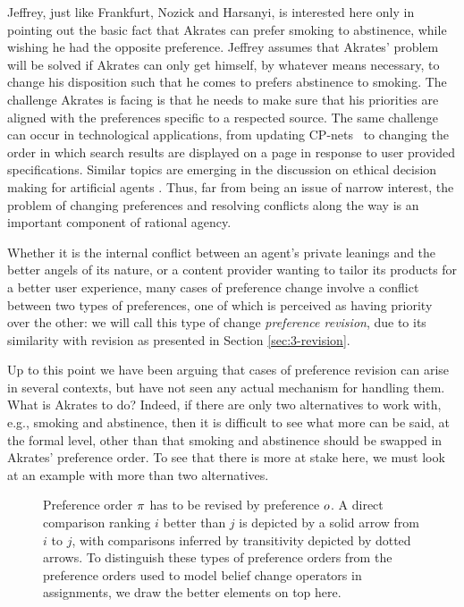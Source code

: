 Jeffrey, just like Frankfurt, Nozick and Harsanyi,
is interested here only in pointing out the basic fact 
that Akrates can prefer smoking to abstinence, 
while wishing he had the opposite preference.
Jeffrey assumes that Akrates' problem will be solved 
if Akrates can only get himself, by whatever means necessary,
to change his disposition such that he comes to 
prefers abstinence to smoking.
The challenge Akrates is facing is that he needs to
make sure that his priorities 
are aligned with the preferences specific to a respected source.
The same challenge can occur in technological applications, 
from updating CP-nets~\cite{CadilhacALB15}
to changing the order in which search results 
are displayed on a page in response to user provided specifications.
Similar topics are emerging in the discussion 
on ethical decision making for artificial agents \cite{RossiM19}.
Thus, far from being an issue of narrow interest, 
the problem of changing preferences and 
resolving conflicts along the way is an important 
component of rational agency.

Whether it is the internal conflict between 
an agent's private leanings and the better angels of its nature,
or a content provider wanting to tailor its products 
for a better user experience, 
many cases of preference change involve a conflict
between two types of preferences, one of which is 
perceived as having priority over the other:
we will call this type of change 
\emph{preference revision}, due to its similarity 
with revision as presented in Section \ref{sec:3-revision}.

Up to this point we have been arguing that 
cases of preference revision can arise in several contexts, 
but have not seen any actual mechanism for handling them.
What is Akrates to do?
Indeed, if there are only two alternatives 
to work with,
e.g., smoking and abstinence, 
then it is difficult to see what more can be said,
at the formal level, other than that smoking and abstinence 
should be swapped in Akrates' preference order.
To see that there is more at stake here, 
we must look at an example with more than two alternatives.

\begin{figure}\centering
	\caption{
		Preference order $\pi$ has to be revised by
		preference $o$.
		A direct comparison ranking $i$ better than $j$ is
		depicted by a solid arrow from $i$ to $j$, 
		with comparisons inferred by transitivity depicted by dotted arrows.
		To distinguish these types of preference orders 
		from the preference orders used to model belief change operators 
		in assignments, we draw the better elements on top here.
		}
	\label{fig:7-pref-change-3-alternatives}
\end{figure}

